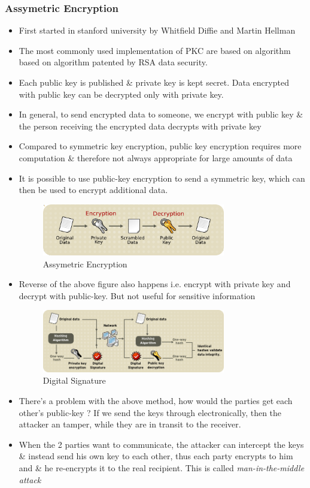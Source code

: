 \documentclass[a4paper]{article}
\begin{document}
\subsubsection{Assymetric Encryption}
\begin{itemize}
    \item First started in stanford university by Whitfield Diffie and Martin Hellman
    \item The most commonly used implementation of PKC are based on algorithm based on algorithm patented by RSA data security.
    \item Each public key is published \& private key is kept secret. Data encrypted with public key can be decrypted only with private key.
    \item In general, to send encrypted data to someone, we encrypt with public key \& the person receiving the 
        encrypted data decrypts with private key
    \item Compared to symmetric key encryption, public key encryption requires more computation \& therefore not always appropriate for large amounts of data
    \item It is possible to use public-key encryption to send a symmetric key, which can then be used to encrypt additional data.
        \begin{figure}[h]
            \centering
            \includegraphics[width=80mm]{assymetric.png}
            \caption{Assymetric Encryption}
        \end{figure}
    \item Reverse of the above figure also happens i.e. encrypt with private key and decrypt with public-key. But not useful for sensitive information
        \begin{figure}[h]
        \centering
        \includegraphics[width=80mm]{digitalsignature.png}
        \caption{Digital Signature ~\cite{RedHat:CSoverview}} 
        \end{figure}
    \item There's a problem with the above method, how would the parties get each other's public-key ? 
        If we send the keys through electronically, then the attacker an tamper, while they are in transit to the receiver.
    \item When the 2 parties want to communicate, the attacker can intercept the keys \& instead send his own key to each other, 
        thus each party encrypts to him and \& he re-encrypts it to the real recipient. 
        This is called \textit{man-in-the-middle attack}
\end{itemize}
\end{document}
